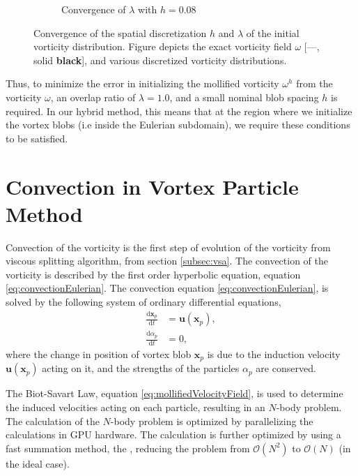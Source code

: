 \begin{figure}[!t]
\begin{subfigure}[b]{0.45\textwidth}
                \caption{Convergence of $\lambda$ with $h = 0.08$}
                \label{fig:convergenceOfBlobsOverlap}
        \end{subfigure}
        \caption{Convergence of the spatial discretization $h$ and $\lambda$ of the initial vorticity distribution. Figure depicts the exact vorticity field $\omega$ [---, solid \textbf{black}], and various discretized vorticity distributions.}
        \label{fig:convergenceOfSpatialResolution}
\end{figure}

Thus, to minimize the error in initializing the mollified vorticity $\omega^h$ from the vorticity $\omega$, an overlap ratio of $\lambda = 1.0$, and a small nominal blob spacing $h$ is required. In our hybrid method, this means that at the region where we initialize the vortex blobs (i.e inside the Eulerian subdomain), we require these conditions to be satisfied. 

\section{Convection in Vortex Particle Method}
\label{sec:covb}

Convection of the vorticity is the first step of evolution of the vorticity from viscous splitting algorithm, from section \ref{subsec:vsa}. The convection of the vorticity is described by the first order hyperbolic equation, equation \ref{eq:convectionEulerian}. The convection equation \ref{eq:convectionEulerian}, is solved by the following system of ordinary differential equations,
	\begin{subequations}
	\begin{align}
	\frac{\mathrm{d}\mathbf{x}_p}{\mathrm{d}t} &= \mathbf{u}\left(\mathbf{x}_p\right),\\
	\frac{\mathrm{d}\alpha_p}{\mathrm{d}t} &= 0,
	\end{align}
	\label{eq:convectionODE}
	\end{subequations}
where the change in position of vortex blob $\mathbf{x}_p$ is due to the induction velocity $\mathbf{u}\left(\mathbf{x}_p\right)$ acting on it, and the strengths of the particles $\alpha_p$ are conserved.

The Biot-Savart Law, equation \ref{eq:mollifiedVelocityField}, is used to determine the induced velocities acting on each particle, resulting in an $N$-body problem. The calculation of the $N$-body problem is optimized by parallelizing the calculations in GPU hardware. The calculation is further optimized by using a fast summation method, the , reducing the problem from $\mathcal{O}(N^2)$ to $\mathcal{O}(N)$ (in the ideal case).

